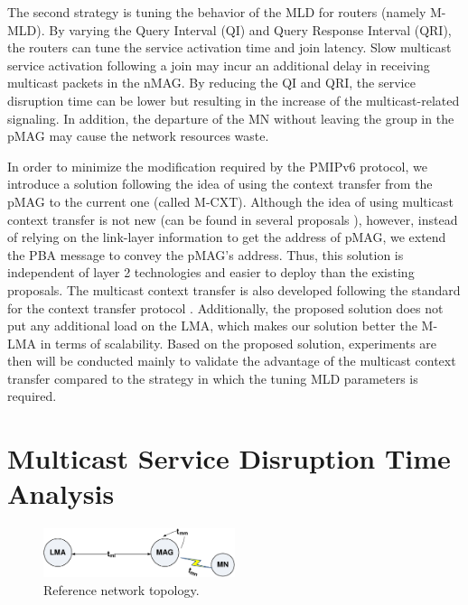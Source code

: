 The second strategy \cite{tuning_MLD} is tuning the behavior of the MLD for routers (namely M-MLD). By varying the Query Interval (QI) and Query Response Interval (QRI), the routers can tune the service activation time and join latency. Slow multicast service activation following a join may incur an additional delay in receiving multicast packets in the nMAG. By reducing the QI and QRI, the service disruption time can be lower but resulting in the increase of the multicast-related signaling. In addition, the departure of the MN without leaving the group in the pMAG may cause the network resources waste.

In order to minimize the modification required by the PMIPv6 protocol, we introduce a solution following the idea of using the context transfer from the pMAG to the current one (called M-CXT). Although the idea of using multicast context transfer is not new (can be found in several proposals \cite{FPMIPv6_multicast, PMIP_multicast_fast_HO_Lee,PMIP_multicast_fast_HO_Gohar}), however, instead of relying on the link-layer information to get the address of pMAG, we extend the PBA message to convey the pMAG's address. Thus, this solution is independent of layer 2 technologies and easier to deploy than the existing proposals. The multicast context transfer is also developed following the standard for the context transfer protocol \cite{CXTP}. Additionally, the proposed solution does not put any additional load on the LMA, which makes our solution better the M-LMA in terms of scalability. Based on the proposed solution, experiments are then will be conducted mainly to validate the advantage of the multicast context transfer compared to the strategy in which the tuning MLD parameters is required. 

\section{Multicast Service Disruption Time Analysis}\label{section:performance_analysis}
\begin{figure}[h!] 
 \begin{center} 
 \includegraphics[width=0.50\textwidth]{./Part2/Chapter4/figures/c6_topology_analysis.eps} 
    \caption[Reference network topology for the  multicast service disruption time analysis.]{Reference network topology.}
     \label{fig:c6_topology_analysis}
  \end{center} 
\end{figure}

